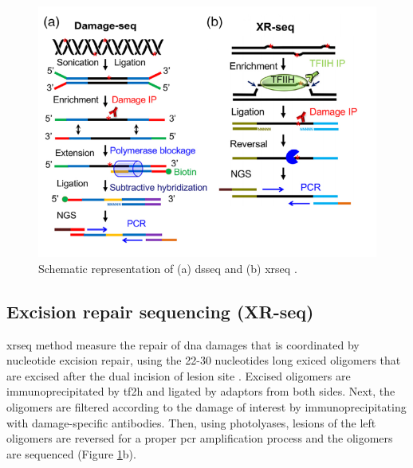 \begin{figure}[H]
    \begin{center}
    \includegraphics[width=\textwidth]{Chapters/1_introduction/figures/dsxrseq}
    \caption{Schematic representation of (a) \gls{dsseq} and (b) \gls{xrseq} \citep{li2020methodologies}.}
    \label{fig:dsxrseq}
    \end{center}
    \end{figure}

\subsection{Excision repair sequencing (XR-seq)}

\gls{xrseq} method measure the repair of \gls{dna} damages that is coordinated by nucleotide excision repair, using the 22-30 nucleotides long exiced oligomers that are excised after the dual incision of lesion site \citep{hu2019genome,hu2016cisplatin}. Excised oligomers are immunoprecipitated by \gls{tf2h} and ligated by adaptors from both sides. Next, the oligomers are filtered according to the damage of interest by immunoprecipitating with damage-specific antibodies. Then, using photolyases, lesions of the left oligomers are reversed for a proper \gls{pcr} amplification process and the oligomers are sequenced (Figure \ref{fig:dsxrseq}b).
